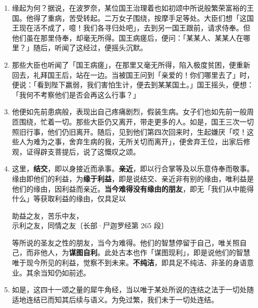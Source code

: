 \begin{enumerate}\item 缘起为何？据说，在波罗奈，某位国王治理着也如初颂中所说般繁荣富裕的王国。他得了重病，苦受转起。二万女子围绕，按摩手足等处。大臣们想「这国王现在活不成了，噫！我们各寻归处吧」，去到另一国王跟前，请求侍奉。但他们虽在那里侍奉，却毫无所得。国王病瘥后，便问：「某某人、某某人在哪里？」随后，听闻了这经过，便摇头沉默。
\item 那些大臣也听闻了「国王病瘥」，在那里又毫无所得，陷入极度贫困，便重新回去，礼拜国王后，站在一边。当被国王问到「亲爱的！你们哪里去了」时，便说：「看到陛下羸弱，我们害怕生计，便去到某某国土。」国王摇头，便想：「我何不考察他们是否会再这么行事？」
\item 他便如先前患病般，表现出自己疼痛剧烈，假装生病。女子们也如先前一般周匝围绕，忙着一切。那些大臣仍又离开，带走更多的人。如是，国王三次一切照旧行事，他们仍旧离开。随后，见到他们第四次回来时，生起嫌厌「哎！这些人为难为之事，舍弃生病的我，无所关切而离开」，便舍弃王位，出家后修观，证得辟支菩提后，说了这慨叹之颂。
\item 这里，\textbf{结交}，即以身接近而承事。\textbf{亲近}，即以行合掌等及以乐意侍奉而敬事。缘由即他们的利益，为\textbf{缘于利益}，即是说结交、亲近非有别的缘由，唯利益是他们的缘由，因利益而亲近。\textbf{当今难得没有缘由的朋友}，即无「我们从中能得什么」等获取利益的缘由，仅具足以\begin{quoting}助益之友，苦乐中友，\\示利之友，同情之友{\bluefootnotesize 〔长部·尸迦罗经第 265 段〕}\end{quoting}等所说的圣友之性的朋友，当今为难得。他们的智慧停留于自己，唯关照自己，而非他人，为\textbf{谋图自利}。此处古本也作「谋图现利」，即是说他们的智慧唯于现今所见的利益，觉察不到未来。\textbf{不纯洁}，即具足不纯洁、非圣的身语意业。其余当知仍如前述。
\item 如是，这四十一颂之量的犀牛角经，当以唯于某处所说的连结之法于一切处随适地连结已而知其后续与语义。为免过繁，我们未于一切处连结。\end{enumerate}

